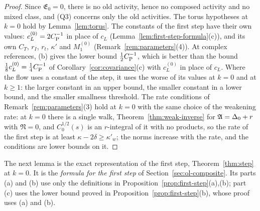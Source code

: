 \begin{proof}
Since $\mathfrak E_0=0$, there is no old activity, hence no composed activity and no mixed class, and (Q3) concerns only the old activities. The torus hypotheses at $k=0$ hold by Lemma~\ref{lem:torus}. The constants of the first step have their own values: $c^{(0)}_L=2C_{\rm P}^{-1}$ in place of $c_L$ (Lemma~\ref{lem:first-step-formula}(c)), and its own $C_T$, $r_I$, $r_t$, $\kappa'$ and $M_1^{(0)}$ (Remark~\ref{rem:parameters}(4)). At complex references, (b) gives the lower bound $\frac12C_{\rm P}^{-1}$, which is better than the bound $\frac18c^{(0)}_L=\frac14C_{\rm P}^{-1}$ of Corollary~\ref{cor:covariance}(c) with $c^{(0)}_L$ in place of $c_L$. Where the flow uses a constant of the step, it uses the worse of its values at $k=0$ and at $k\ge1$: the larger constant in an upper bound, the smaller constant in a lower bound, and the smaller smallness threshold. The rate conditions of Remark~\ref{rem:parameters}(3) hold at $k=0$ with the same choice of the weakening rate: at $k=0$ there is a single walk, Theorem~\ref{thm:weak-inverse} for $\mathfrak A=\Delta_0+r$ with $\mathfrak N=0$, and $C^{1/2}_0(s)$ is an $r$-integral of it with no products, so the rate of the first step is at least $\kappa-2\delta\ge\kappa'_w$; the norms increase with the rate, and the conditions are lower bounds on it.
\end{proof}

The next lemma is the exact representation of the first step, Theorem~\ref{thm:step} at $k=0$. It is the \emph{formula for the first step} of Section~\ref{sec:ol-composite}. Its parts (a) and (b) use only the definitions in Proposition~\ref{prop:first-step}(a),(b); part (c) uses the lower bound proved in Proposition~\ref{prop:first-step}(b), whose proof uses (a) and (b).

